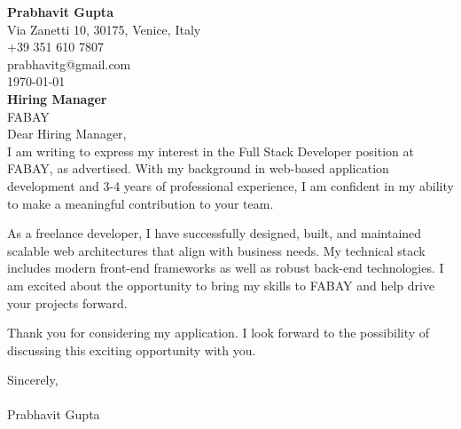 \documentclass[11pt,a4paper]{article}
\begin{document}
\noindent
\textbf{Prabhavit Gupta} \\
Via Zanetti 10, 30175, Venice, Italy \\
+39 351 610 7807 \\
prabhavitg@gmail.com \\

\vspace{1em}
\noindent
\today \\

\vspace{1em}
\noindent
\textbf{Hiring Manager} \\
FABAY \\

\vspace{1em}
\noindent
Dear Hiring Manager, \\

\vspace{1em}
\noindent
I am writing to express my interest in the Full Stack Developer position at FABAY, as advertised. With my background in web-based application development and 3-4 years of professional experience, I am confident in my ability to make a meaningful contribution to your team.

\vspace{1em}
\noindent
As a freelance developer, I have successfully designed, built, and maintained scalable web architectures that align with business needs. My technical stack includes modern front-end frameworks as well as robust back-end technologies. I am excited about the opportunity to bring my skills to FABAY and help drive your projects forward.

\vspace{1em}
\noindent
Thank you for considering my application. I look forward to the possibility of discussing this exciting opportunity with you.

\vspace{1em}
\noindent
Sincerely, \\
\vspace{1em} \\
Prabhavit Gupta
\end{document}
